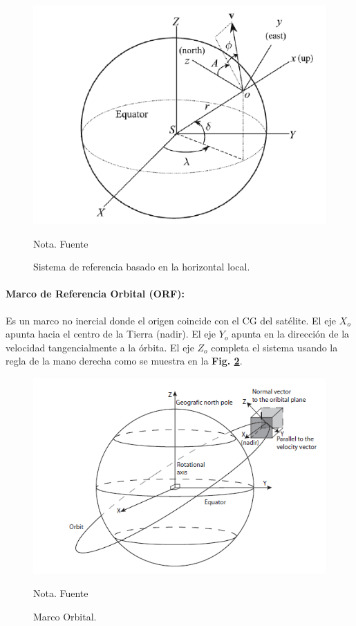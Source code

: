 \begin{figure}[!ht]
	\begin{center}
		\includegraphics[scale=0.7]{imagenes/marco_teorico/LVLH.PNG}\\
	\end{center}
	\caption{ Sistema de referencia basado en la horizontal local.}
	\label{fig:LVLH}
	\footnotesize{Nota. Fuente \cite{cornelisse1979rocket}}
\end{figure}

\paragraph{Marco de Referencia Orbital (ORF):} Es un marco no inercial donde el origen coincide con el CG del satélite. El eje $X_o$ apunta hacia el centro de la Tierra (nadir). El eje $Y_o$ apunta en la dirección de la velocidad tangencialmente a la órbita. El eje $Z_o$ completa el sistema usando la regla de la mano derecha como se muestra en la \textbf{Fig. \ref{fig:marco_orbital}}.

\begin{figure}[!ht]
	\begin{center}
		\includegraphics[scale=0.7]{imagenes/marco_teorico/marco_orbital.PNG}\\
	\end{center}
	\caption{ Marco Orbital.}
	\label{fig:marco_orbital}
	\footnotesize{Nota. Fuente \cite{Andresen2005}}
\end{figure}



